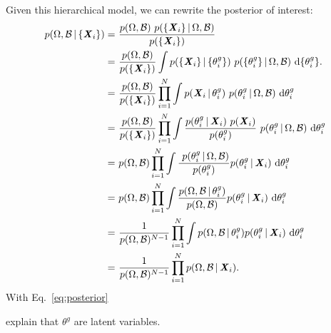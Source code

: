 Given this hierarchical model, we can rewrite the posterior of interest: 
\begin{align}
p(\Omega, \mathcal{B} \,|\, \{{\textbf{\textit{X}}_i}\}) 
    =&~\frac{p(\Omega, \mathcal{B})~p(\{{\textbf{\textit{X}}_i}\} \,|\, \Omega, \mathcal{B})}{p(\{{\textbf{\textit{X}}_i}\})}\\
    =&~\frac{p(\Omega, \mathcal{B})}{p(\{{\textbf{\textit{X}}_i}\})}\int p(\{{\textbf{\textit{X}}_i}\}
    \,|\, \{\theta^g_i\})~p(\{\theta^g_i\} \,|\, \Omega, \mathcal{B})~{\rm d}\{\theta^g_i\}.\\
    =&~\frac{p(\Omega, \mathcal{B})}{p(\{{\textbf{\textit{X}}_i}\})}\prod\limits_{i=1}^N\int
    p({\textbf{\textit{X}}_i} \,|\, \theta^g_i)~p(\theta^g_i \,|\, \Omega, \mathcal{B})~{\rm d}\theta^g_i\\
    =&~\frac{p(\Omega, \mathcal{B})}{p(\{{\textbf{\textit{X}}_i}\})}\prod\limits_{i=1}^N\int
    \frac{p(\theta^g_i \,|\, {\textbf{\textit{X}}_i})~p({\textbf{\textit{X}}_i})}{p(\theta^g_i)}~p(\theta^g_i \,|\, \Omega, \mathcal{B})~{\rm d}\theta^g_i\\
    =&~p(\Omega, \mathcal{B})\prod\limits_{i=1}^N\int \frac{~p(\theta^g_i
    \,|\, \Omega, \mathcal{B})}{p(\theta^g_i)} p(\theta^g_i \,|\, {\textbf{\textit{X}}_i})
    ~{\rm d}\theta^g_i\\
    =&~p(\Omega, \mathcal{B})\prod\limits_{i=1}^N\int \frac{p(\Omega, \mathcal{B}\,|\, \theta^g_i)}{p(\Omega, \mathcal{B})}
p(\theta^g_i \,|\, {\textbf{\textit{X}}_i})~{\rm d}\theta^g_i \\
     \label{eq:post0}
    =&~\frac{1}{p(\Omega, \mathcal{B})^{N-1}}\prod\limits_{i=1}^N\int p(\Omega,
    \mathcal{B}\,|\, \theta^g_i) p(\theta^g_i \,|\, {\textbf{\textit{X}}_i})~{\rm
    d}\theta^g_i  \\
     \label{eq:posterior}
    =&~\frac{1}{p(\Omega, \mathcal{B})^{N-1}}\prod\limits_{i=1}^N p(\Omega,
    \mathcal{B}\,|\, {\textbf{\textit{X}}_i}).
\end{align} 
With Eq.~\ref{eq:posterior}

explain that $\theta^g$ are latent variables. 


